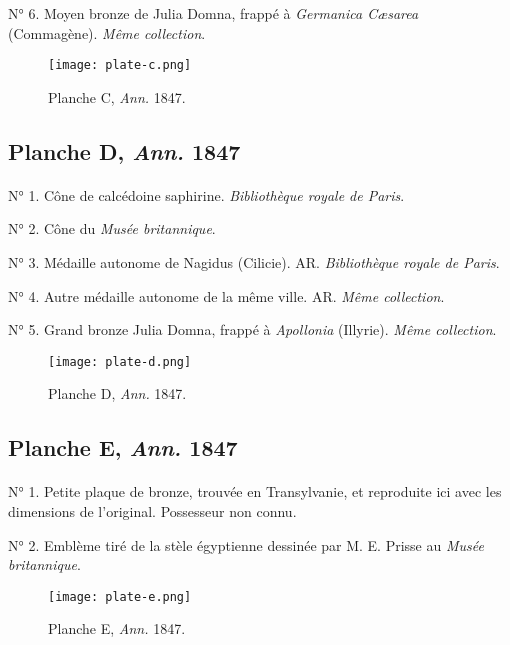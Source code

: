 \documentclass[a4paper, 11pt, oneside, polutonikogreek, french]{article}
\begin{document}
N° 6. Moyen bronze de Julia Domna, frappé à \emph{Germanica Cæsarea} (Commagène). \emph{Même collection}.
\vspace*{\fill}
\clearpage
\pagestyle{fancy}
\fancyhf{}
\cfoot{{\thepage}}
\vspace*{\fill}
\begin{figure}[H]
\centering
\texttt{[image: plate-c.png]}
\caption{Planche C, \emph{Ann.} 1847.}
\end{figure}
\vspace*{\fill}
\clearpage
\pagestyle{plain}
\vspace*{\fill}
\subsection{Planche D, \emph{Ann.} 1847}
\paragraph{}
N° 1. Cône de calcédoine saphirine. \emph{Bibliothèque royale de Paris}.

N° 2. Cône du \emph{Musée britannique}.

N° 3. Médaille autonome de Nagidus (Cilicie). AR. \emph{Bibliothèque royale de Paris}.

N° 4. Autre médaille autonome de la même ville. AR. \emph{Même collection}.

N° 5. Grand bronze Julia Domna, frappé à \emph{Apollonia} (Illyrie). \emph{Même collection}.
\vspace*{\fill}
\clearpage
\pagestyle{fancy}
\fancyhf{}
\cfoot{{\thepage}}
\vspace*{\fill}
\begin{figure}[H]
\centering
\texttt{[image: plate-d.png]}
\caption{Planche D, \emph{Ann.} 1847.}
\end{figure}
\vspace*{\fill}
\clearpage
\pagestyle{plain}
\vspace*{\fill}
\subsection{Planche E, \emph{Ann.} 1847}
\paragraph{}
N° 1. Petite plaque de bronze, trouvée en Transylvanie, et reproduite ici avec les dimensions de l'original. Possesseur non connu.

N° 2. Emblème tiré de la stèle égyptienne dessinée par M. E. Prisse au \emph{Musée britannique}.
\vspace*{\fill}
\clearpage
\pagestyle{fancy}
\fancyhf{}
\cfoot{{\thepage}}
\vspace*{\fill}
\begin{figure}[H]
\centering
\texttt{[image: plate-e.png]}
\caption{Planche E, \emph{Ann.} 1847.}
\end{figure}
\vspace*{\fill}
\clearpage
\end{document}
